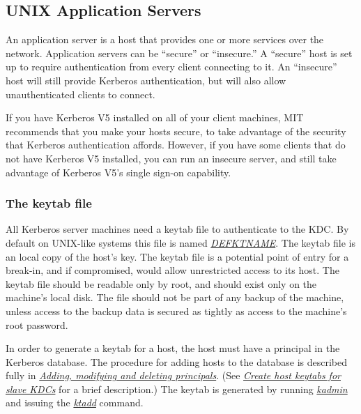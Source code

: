 \documentclass[letterpaper,10pt,english]{sphinxmanual}
\begin{document}
\subsection{UNIX Application Servers}
\label{admin/install_appl_srv:unix-application-servers}\label{admin/install_appl_srv::doc}
An application server is a host that provides one or more services
over the network.  Application servers can be ``secure'' or ``insecure.''
A ``secure'' host is set up to require authentication from every client
connecting to it.  An ``insecure'' host will still provide Kerberos
authentication, but will also allow unauthenticated clients to
connect.

If you have Kerberos V5 installed on all of your client machines, MIT
recommends that you make your hosts secure, to take advantage of the
security that Kerberos authentication affords.  However, if you have
some clients that do not have Kerberos V5 installed, you can run an
insecure server, and still take advantage of Kerberos V5's single
sign-on capability.


\subsubsection{The keytab file}
\label{admin/install_appl_srv:the-keytab-file}\label{admin/install_appl_srv:keytab-file}
All Kerberos server machines need a keytab file to authenticate to the
KDC.  By default on UNIX-like systems this file is named {\hyperref[mitK5defaults:paths]{\emph{DEFKTNAME}}}.
The keytab file is an local copy of the host's key.  The keytab file
is a potential point of entry for a break-in, and if compromised,
would allow unrestricted access to its host.  The keytab file should
be readable only by root, and should exist only on the machine's local
disk.  The file should not be part of any backup of the machine,
unless access to the backup data is secured as tightly as access to
the machine's root password.

In order to generate a keytab for a host, the host must have a
principal in the Kerberos database.  The procedure for adding hosts to
the database is described fully in {\hyperref[admin/database:add-mod-del-princs]{\emph{Adding, modifying and deleting principals}}}.  (See
{\hyperref[admin/install_kdc:slave-host-key]{\emph{Create host keytabs for slave KDCs}}} for a brief description.)  The keytab is
generated by running {\hyperref[admin/admin_commands/kadmin_local:kadmin-1]{\emph{kadmin}}} and issuing the {\hyperref[admin/admin_commands/kadmin_local:ktadd]{\emph{ktadd}}}
command.
\end{document}
